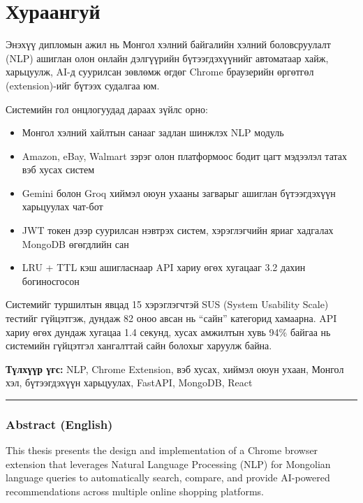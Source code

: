 \documentclass[12pt,a4paper]{report}
\begin{document}
\thispagestyle{plain}
\chapter*{Хураангуй}

Энэхүү дипломын ажил нь Монгол хэлний байгалийн хэлний боловсруулалт (NLP) ашиглан олон онлайн дэлгүүрийн бүтээгдэхүүнийг автоматаар хайж, харьцуулж, AI-д суурилсан зөвлөмж өгдөг Chrome браузерийн өргөтгөл (extension)-ийг бүтээх судалгаа юм.

Системийн гол онцлогуудад дараах зүйлс орно:
\begin{itemize}[leftmargin=1.5cm]
  \item Монгол хэлний хайлтын санааг задлан шинжлэх NLP модуль
  \item Amazon, eBay, Walmart зэрэг олон платформоос бодит цагт мэдээлэл татах вэб хусах систем
  \item Gemini болон Groq хиймэл оюун ухааны загварыг ашиглан бүтээгдэхүүн харьцуулах чат-бот
  \item JWT токен дээр суурилсан нэвтрэх систем, хэрэглэгчийн яриаг хадгалах MongoDB өгөгдлийн сан
  \item LRU + TTL кэш ашигласнаар API хариу өгөх хугацааг 3.2 дахин богиносгосон
\end{itemize}

Системийг туршилтын явцад 15 хэрэглэгчтэй SUS (System Usability Scale) тестийг гүйцэтгэж, дундаж 82 оноо авсан нь ``сайн'' категорид хамаарна. API хариу өгөх дундаж хугацаа 1.4 секунд, хусах амжилтын хувь 94\% байгаа нь системийн гүйцэтгэл хангалттай сайн болохыг харуулж байна.

\vspace{12pt}
\noindent\textbf{Түлхүүр үгс:} NLP, Chrome Extension, вэб хусах, хиймэл оюун ухаан, Монгол хэл, бүтээгдэхүүн харьцуулах, FastAPI, MongoDB, React

\vspace{18pt}
\noindent\rule{\textwidth}{0.5pt}

\subsection*{Abstract (English)}
This thesis presents the design and implementation of a Chrome browser extension that leverages Natural Language Processing (NLP) for Mongolian language queries to automatically search, compare, and provide AI-powered recommendations across multiple online shopping platforms.
\end{document}
